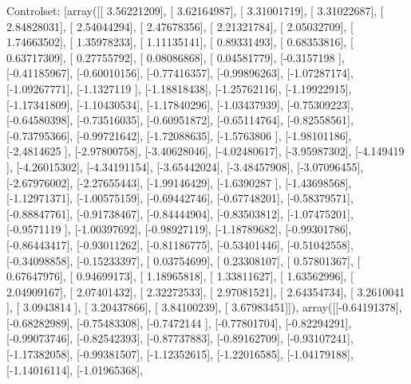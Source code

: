 \documentclass{article}
\begin{document}
Controlset: [array([[ 3.56221209],
       [ 3.62164987],
       [ 3.31001719],
       [ 3.31022687],
       [ 2.84828031],
       [ 2.54044294],
       [ 2.47678356],
       [ 2.21321784],
       [ 2.05032709],
       [ 1.74663502],
       [ 1.35978233],
       [ 1.11135141],
       [ 0.89331493],
       [ 0.68353816],
       [ 0.63717309],
       [ 0.27755792],
       [ 0.08086868],
       [ 0.04581779],
       [-0.3157198 ],
       [-0.41185967],
       [-0.60010156],
       [-0.77416357],
       [-0.99896263],
       [-1.07287174],
       [-1.09267771],
       [-1.1327119 ],
       [-1.18818438],
       [-1.25762116],
       [-1.19922915],
       [-1.17341809],
       [-1.10430534],
       [-1.17840296],
       [-1.03437939],
       [-0.75309223],
       [-0.64580398],
       [-0.73516035],
       [-0.60951872],
       [-0.65114764],
       [-0.82558561],
       [-0.73795366],
       [-0.99721642],
       [-1.72088635],
       [-1.5763806 ],
       [-1.98101186],
       [-2.4814625 ],
       [-2.97800758],
       [-3.40628046],
       [-4.02480617],
       [-3.95987302],
       [-4.149419  ],
       [-4.26015302],
       [-4.34191154],
       [-3.65442024],
       [-3.48457908],
       [-3.07096455],
       [-2.67976002],
       [-2.27655443],
       [-1.99146429],
       [-1.6390287 ],
       [-1.43698568],
       [-1.12971371],
       [-1.00575159],
       [-0.69442746],
       [-0.67748201],
       [-0.58379571],
       [-0.88847761],
       [-0.91738467],
       [-0.84444904],
       [-0.83503812],
       [-1.07475201],
       [-0.9571119 ],
       [-1.00397692],
       [-0.98927119],
       [-1.18789682],
       [-0.99301786],
       [-0.86443417],
       [-0.93011262],
       [-0.81186775],
       [-0.53401446],
       [-0.51042558],
       [-0.34098858],
       [-0.15233397],
       [ 0.03754699],
       [ 0.23308107],
       [ 0.57801367],
       [ 0.67647976],
       [ 0.94699173],
       [ 1.18965818],
       [ 1.33811627],
       [ 1.63562996],
       [ 2.04909167],
       [ 2.07401432],
       [ 2.32272533],
       [ 2.97081521],
       [ 2.64354734],
       [ 3.2610041 ],
       [ 3.0943814 ],
       [ 3.20437866],
       [ 3.84100239],
       [ 3.67983451]]), array([[-0.64191378],
       [-0.68282989],
       [-0.75483308],
       [-0.7472144 ],
       [-0.77801704],
       [-0.82294291],
       [-0.99073746],
       [-0.82542393],
       [-0.87737883],
       [-0.89162709],
       [-0.93107241],
       [-1.17382058],
       [-0.99381507],
       [-1.12352615],
       [-1.22016585],
       [-1.04179188],
       [-1.14016114],
       [-1.01965368],
\end{document}
